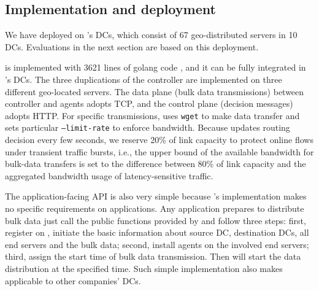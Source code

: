 \subsection{Implementation and deployment}
\label{sec:deployment}


We have deployed \name on \company's DCs, which consist of 67 geo-distributed servers in 10 DCs. Evaluations in the next section are based on this deployment. %

\name is implemented with 3621 lines of golang code \cite{golang}, and it can be fully integrated in \company's DCs. The three duplications of the controller are implemented on three different geo-located servers.
The data plane (bulk data transmissions) between controller and agents adopts TCP, and the control plane (decision messages) adopts HTTP. For specific transmissions, \name uses \texttt{wget} to make data transfer and sets particular \texttt{--limit-rate} to enforce bandwidth.
Because \name updates routing decision every few seconds,
we reserve 20\% of link capacity to protect online flows
under transient traffic bursts,
i.e., the upper bound of the available bandwidth for bulk-data
transfers is set to the difference between 80\% of
link capacity and the aggregated bandwidth usage of
latency-sensitive traffic.



The application-facing API is also very simple because \name's implementation makes no specific requirements on applications. Any application prepares to distribute bulk data just call the public functions provided by \name and follow three steps: first, register on \name, initiate the basic information about source DC, destination DCs, all end servers and the bulk data; second, install agents on the involved end servers; third, assign the start time of bulk data transmission. Then \name will start the data distribution at the specified time. Such simple implementation also makes \name applicable to other companies' DCs. 	

